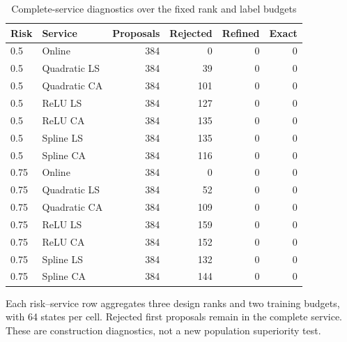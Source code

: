 \begin{table}[t]
\centering\small
\caption{Complete-service diagnostics over the fixed rank and label budgets}\label{tab:diagnostics97}
\begin{tabular}{llrrrr}\toprule
Risk & Service & Proposals & Rejected & Refined & Exact \\ \midrule
0.5 & Online & 384 & 0 & 0 & 0 \\
0.5 & Quadratic LS & 384 & 39 & 0 & 0 \\
0.5 & Quadratic CA & 384 & 101 & 0 & 0 \\
0.5 & ReLU LS & 384 & 127 & 0 & 0 \\
0.5 & ReLU CA & 384 & 135 & 0 & 0 \\
0.5 & Spline LS & 384 & 135 & 0 & 0 \\
0.5 & Spline CA & 384 & 116 & 0 & 0 \\
0.75 & Online & 384 & 0 & 0 & 0 \\
0.75 & Quadratic LS & 384 & 52 & 0 & 0 \\
0.75 & Quadratic CA & 384 & 109 & 0 & 0 \\
0.75 & ReLU LS & 384 & 159 & 0 & 0 \\
0.75 & ReLU CA & 384 & 152 & 0 & 0 \\
0.75 & Spline LS & 384 & 132 & 0 & 0 \\
0.75 & Spline CA & 384 & 144 & 0 & 0 \\
\bottomrule\end{tabular}
\par\smallskip\parbox{\linewidth}{\footnotesize Each risk--service row aggregates three design ranks and two training budgets, with 64 states per cell. Rejected first proposals remain in the complete service. These are construction diagnostics, not a new population superiority test.}
\end{table}
